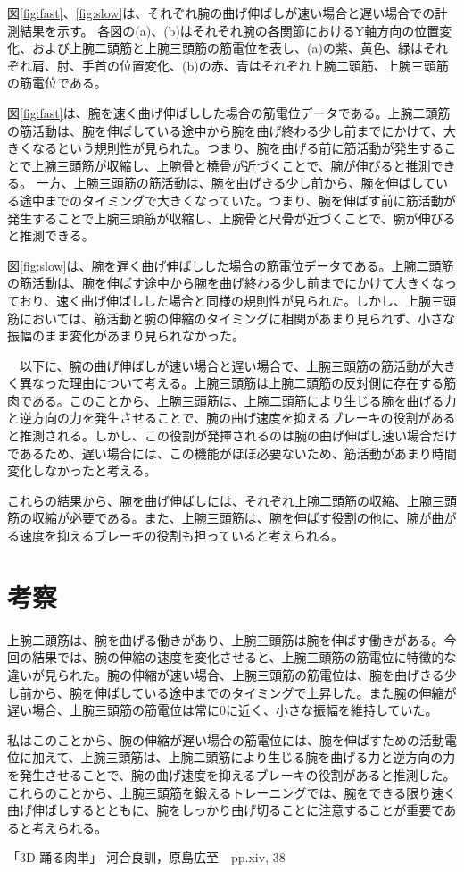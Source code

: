 \documentclass{jsarticle}
\begin{document}
図\ref{fig:fast}、\ref{fig:slow}は、それぞれ腕の曲げ伸ばしが速い場合と遅い場合での計測結果を示す。
各図の(a)、(b)はそれぞれ腕の各関節におけるY軸方向の位置変化、および上腕二頭筋と上腕三頭筋の筋電位を表し、(a)の紫、黄色、緑はそれぞれ肩、肘、手首の位置変化、(b)の赤、青はそれぞれ上腕二頭筋、上腕三頭筋の筋電位である。

図\ref{fig:fast}は、腕を速く曲げ伸ばしした場合の筋電位データである。上腕二頭筋の筋活動は、腕を伸ばしている途中から腕を曲げ終わる少し前までにかけて、大きくなるという規則性が見られた。つまり、腕を曲げる前に筋活動が発生することで上腕三頭筋が収縮し、上腕骨と橈骨が近づくことで、腕が伸びると推測できる。
一方、上腕三頭筋の筋活動は、腕を曲げきる少し前から、腕を伸ばしている途中までのタイミングで大きくなっていた。つまり、腕を伸ばす前に筋活動が発生することで上腕三頭筋が収縮し、上腕骨と尺骨が近づくことで、腕が伸びると推測できる。

図\ref{fig:slow}は、腕を遅く曲げ伸ばしした場合の筋電位データである。上腕二頭筋の筋活動は、腕を伸ばす途中から腕を曲げ終わる少し前までにかけて大きくなっており、速く曲げ伸ばしした場合と同様の規則性が見られた。しかし、上腕三頭筋においては、筋活動と腕の伸縮のタイミングに相関があまり見られず、小さな振幅のまま変化があまり見られなかった。

　以下に、腕の曲げ伸ばしが速い場合と遅い場合で、上腕三頭筋の筋活動が大きく異なった理由について考える。上腕三頭筋は上腕二頭筋の反対側に存在する筋肉である。このことから、上腕三頭筋は、上腕二頭筋により生じる腕を曲げる力と逆方向の力を発生させることで、腕の曲げ速度を抑えるブレーキの役割があると推測される。しかし、この役割が発揮されるのは腕の曲げ伸ばし速い場合だけであるため、遅い場合には、この機能がほぼ必要ないため、筋活動があまり時間変化しなかったと考える。　

これらの結果から、腕を曲げ伸ばしには、それぞれ上腕二頭筋の収縮、上腕三頭筋の収縮が必要である。また、上腕三頭筋は、腕を伸ばす役割の他に、腕が曲がる速度を抑えるブレーキの役割も担っていると考えられる。

\section{考察}

上腕二頭筋は、腕を曲げる働きがあり、上腕三頭筋は腕を伸ばす働きがある\cite{reference1}。今回の結果では、腕の伸縮の速度を変化させると、上腕三頭筋の筋電位に特徴的な違いが見られた。腕の伸縮が速い場合、上腕三頭筋の筋電位は、腕を曲げきる少し前から、腕を伸ばしている途中までのタイミングで上昇した。また腕の伸縮が遅い場合、上腕三頭筋の筋電位は常に0に近く、小さな振幅を維持していた。

私はこのことから、腕の伸縮が遅い場合の筋電位には、腕を伸ばすための活動電位に加えて、上腕三頭筋は、上腕二頭筋により生じる腕を曲げる力と逆方向の力を発生させることで、腕の曲げ速度を抑えるブレーキの役割があると推測した。
これらのことから、上腕三頭筋を鍛えるトレーニングでは、腕をできる限り速く曲げ伸ばしするとともに、腕をしっかり曲げ切ることに注意することが重要であると考えられる。

\begin{thebibliography}{9}
	 「3D 踊る肉単」 河合良訓，原島広至　pp.xiv, 38
\end{thebibliography}
\end{document}
